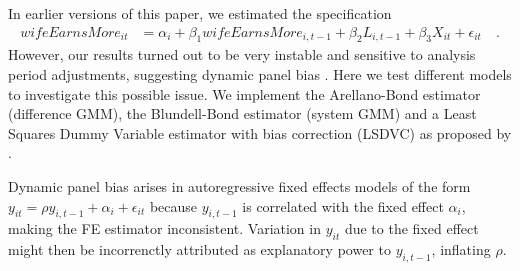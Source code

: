 \documentclass[a4paper,11pt]{scrartcl}
\def\sym#1{\ifmmode^{#1}\else\(^{#1}\)\fi} %
\begin{document}
\begin{appendix}
	\newcommand{\ldsvtable}[3]{
		\begin{table}[H]
			\begin{center}
				\begin{scriptsize}
					\vspace*{3mm}
					\captionof{table}{#1}
					\sisetup{
						table-column-width = 1.6cm,
						table-text-alignment=center,
						table-number-alignment=center,
						table-unit-alignment=center,
						table-figures-integer = 1,
						table-figures-decimal=3,
						input-decimal-markers =	.	,
						input-symbols = , ,
						table-align-text-post = false,
						group-separator={,},
						group-minimum-digits={3},
						output-decimal-marker={.},
						table-space-text-post = \sym{***},
						table-space-text-post = \sym{\dag},
						table-space-text-pre = {(},
						table-space-text-post = {)}
					}
					\noindent
					\strutlongstacks{T}
					{\renewcommand{\arraystretch}{1.2}
						\begin{tabularx} {\textwidth} {@{} X S[table-align-text-post=false] S S S S S S @{}}
							\midrule
							
							\midrule
						\end{tabularx}
					}
					\captionsetup{
						justification=justified,
						textfont={footnotesize, normalfont},
					}
					\caption*{\scriptsize{\xtfenoteA\,#3\,\xtfenoteB}}
				\end{scriptsize}
				\normalsize
			\end{center}
		\end{table}
	}

		In earlier versions of this paper, we estimated the specification
		$$
		\begin{aligned}
		wifeEarnsMore_{it} &= \alpha_i + \beta_1 wifeEarnsMore_{i,t-1} + \beta_2 L_{i,t-1} + \beta_3 X_{it} + \epsilon_{it} \quad.
		\end{aligned}
		$$
		However, our results turned out to be very instable and sensitive to analysis period adjustments, suggesting dynamic panel bias \cite[see][for a detailed account]{roodman2009how}. Here we test different models to investigate this possible issue. We implement the Arellano-Bond estimator (difference GMM), the Blundell-Bond estimator (system GMM) and a Least Squares Dummy Variable estimator with bias correction (LSDVC) as proposed by \cite{bruno2005estimation}.

		Dynamic panel bias arises in autoregressive fixed effects models of the form $y_{it} = \rho y_{i,t-1} + \alpha_i + \epsilon_{it}$ because $y_{i,t-1}$ is correlated with the fixed effect $\alpha_i$, making the FE estimator inconsistent. Variation in $y_{it}$ due to the fixed effect might then be incorrenctly attributed as explanatory power to $y_{i,t-1}$, inflating $\rho$.


\end{appendix}
\end{document}
